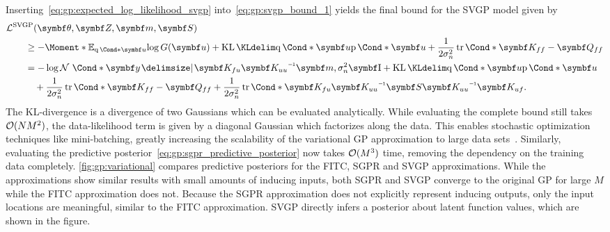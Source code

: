 Inserting~\cref{eq:gp:expected_log_likelihood_svgp} into~\cref{eq:gp:svgp_bound_1} yields the final bound for the SVGP model given by
\begin{equation}
    \begin{split}
        \label{eq:gp:svgp_bound_2}
        \MoveEqLeft\Lc^{\text{SVGP}}(\mat{\theta}, \mat{Z}, \mat{m}, \mat{S}) \\
        &\geq -\Moment*{\E_{\Variat*{\mat{u}}}}{\log G(\mat{u})} + \KL{\Variat*{\mat{u}}}{\Prob*{\mat{u}}} + \frac{1}{2\sigma_n^2}\Fun*{\tr}{\mat{K_{ff}} - \mat{Q_{ff}}} \\
        &=
        -\log \Gaussian*{\mat{y} \given \mat{K_{fu}}\mat{K_{uu}}\inv \mat{m}, \sigma_n^2 \Eye}
        + \KL{\Variat*{\mat{u}}}{\Prob*{\mat{u}}} \\
        &\quad + \frac{1}{2\sigma_n^2} \Fun*{\tr}{\mat{K_{ff}} - \mat{Q_{ff}}}
        + \frac{1}{2\sigma_n^2} \Fun*{\tr}{\mat{K_{fu}}\mat{K_{uu}}\inv \mat{S}\mat{K_{uu}}\inv \mat{K_{uf}}}.
    \end{split}
\end{equation}
The KL-divergence is a divergence of two Gaussians which can be evaluated analytically.
While evaluating the complete bound still takes $\operatorname{\mathcal{O}}(NM^2)$, the data-likelihood term is given by a diagonal Gaussian which factorizes along the data.
This enables stochastic optimization techniques like mini-batching, greatly increasing the scalability of the variational GP approximation to large data sets~\parencite{hensman_gaussian_2013}.
Similarly, evaluating the predictive posterior~\cref{eq:gp:sgpr_predictive_posterior} now takes $\operatorname{\mathcal{O}}(M^3)$ time, removing the dependency on the training data completely.
\cref{fig:gp:variational} compares predictive posteriors for the FITC, SGPR and SVGP approximations.
While the approximations show similar results with small amounts of inducing inputs, both SGPR and SVGP converge to the original GP for large $M$ while the FITC approximation does not.
Because the SGPR approximation does not explicitly represent inducing outputs, only the input locations are meaningful, similar to the FITC approximation.
SVGP directly infers a posterior about latent function values, which are shown in the figure.

